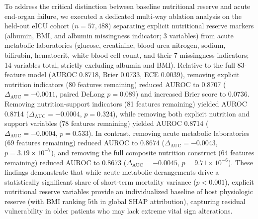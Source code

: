 \documentclass[utf8]{FrontiersinVancouver}
\newcommand{\re}[1]{#1}
\begin{document}
\re{To address the critical distinction between baseline nutritional reserve and acute end-organ failure, we executed a dedicated multi-way ablation analysis on the held-out eICU cohort ($n=57,488$) separating explicit nutritional reserve markers (albumin, BMI, and albumin missingness indicator; 3 variables) from acute metabolic laboratories (glucose, creatinine, blood urea nitrogen, sodium, bilirubin, hematocrit, white blood cell count, and their 7 missingness indicators; 14 variables total, strictly excluding albumin and BMI). Relative to the full 83-feature model (AUROC 0.8718, Brier 0.0733, ECE 0.0039), removing explicit nutrition indicators (80 features remaining) reduced AUROC to 0.8707 ($\Delta_{\mathrm{AUC}} = -0.0011$, paired DeLong $p=0.089$) and increased Brier score to 0.0736. Removing nutrition-support indicators (81 features remaining) yielded AUROC 0.8714 ($\Delta_{\mathrm{AUC}} = -0.0004$, $p=0.324$), while removing both explicit nutrition and support variables (78 features remaining) yielded AUROC 0.8714 ($\Delta_{\mathrm{AUC}} = -0.0004$, $p=0.533$). In contrast, removing acute metabolic laboratories (69 features remaining) reduced AUROC to 0.8674 ($\Delta_{\mathrm{AUC}} = -0.0043$, $p=3.19\times 10^{-7}$), and removing the full composite nutrition construct (64 features remaining) reduced AUROC to 0.8673 ($\Delta_{\mathrm{AUC}} = -0.0045$, $p=9.71\times 10^{-6}$). These findings demonstrate that while acute metabolic derangements drive a statistically significant share of short-term mortality variance ($p<0.001$), explicit nutritional reserve variables provide an individualized baseline of host physiologic reserve (with BMI ranking 5th in global SHAP attribution), capturing residual vulnerability in older patients who may lack extreme vital sign alterations.}
\end{document}
